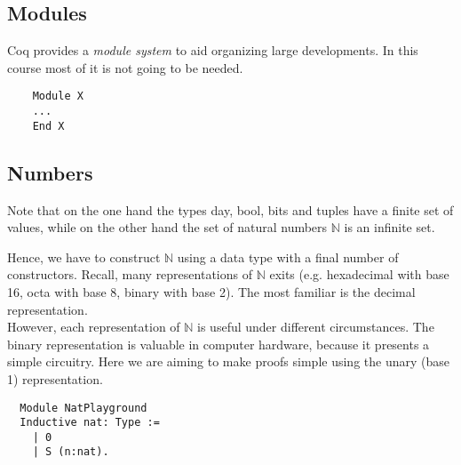 \subsection{Modules}

	Coq provides a {\itshape module system} to aid organizing large developments.
	In this course most of it is not going to be needed.

	\begin{lstlisting}
	Module X 
	...
	End X
	\end{lstlisting}

\subsection{Numbers}

  Note that on the one hand the types day, bool, bits and tuples have a finite set of values, while on the other hand the set of natural numbers $\mathbb{N}$ is an infinite set.
 
  Hence, we have to construct $\mathbb{N}$ using a data type with a final number of constructors. 
  Recall, many representations of $\mathbb{N}$ exits (e.g. hexadecimal with base 16, octa with base 8, binary with base 2).
  The most familiar is the decimal representation.\\
  However, each representation of $\mathbb{N}$ is useful under different circumstances. 
  The binary representation is valuable in computer hardware, because it presents a simple circuitry.
  Here we are aiming to make proofs simple using the unary (base 1) representation.
  
  \begin{lstlisting}
  Module NatPlayground
  Inductive nat: Type :=
    | 0
    | S (n:nat).
  \end{lstlisting}
  
